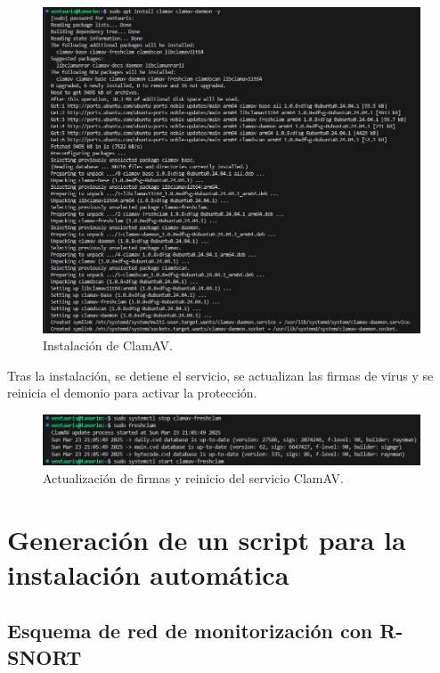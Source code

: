 \documentclass[11pt,a4paper,twoside]{report}
\begin{document}
\begin{figure}[H]
	\centering
	\includegraphics[scale=0.6]{clamAV/1.png}
	\caption{Instalación de ClamAV.}
\end{figure}

Tras la instalación, se detiene el servicio, se actualizan las firmas de virus y se reinicia el demonio para activar la protección.

\begin{figure}[H]
	\centering
	\includegraphics[scale=0.6]{clamAV/2.png}
	\caption{Actualización de firmas y reinicio del servicio ClamAV.}
\end{figure}


\newpage


\section{Generación de un script para la instalación automática}

\subsection{Esquema de red de monitorización con R-SNORT}
\end{document}
